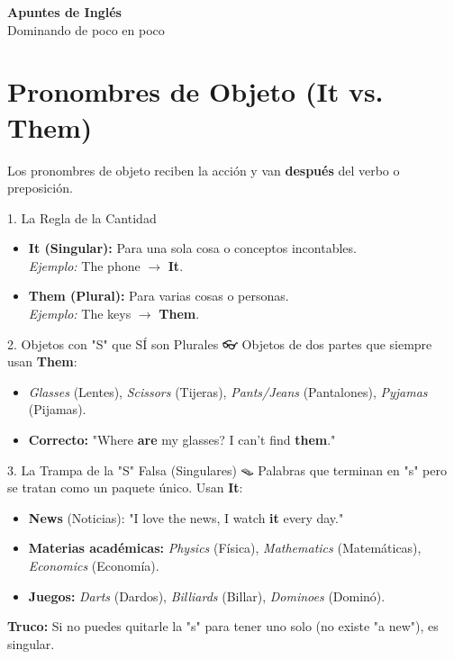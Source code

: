 \documentclass[12pt,a4paper]{article}
\begin{document}
\begin{center}
    {\Huge \color{primary} \textbf{Apuntes de Inglés}} \\
    \vspace{0.2cm}
    {\large \color{secondary} Dominando de poco en poco}
\end{center}

\vspace{0.5cm}

\section{Pronombres de Objeto (It vs. Them)}

Los pronombres de objeto reciben la acción y van \textbf{después} del verbo o preposición.

\begin{note}{1. La Regla de la Cantidad 🔢}
    \begin{itemize}[noitemsep]
        \item \textbf{It (Singular):} Para una sola cosa o conceptos incontables. \\
              \textit{Ejemplo:} The phone $\to$ \textbf{It}.
        \item \textbf{Them (Plural):} Para varias cosas o personas. \\
              \textit{Ejemplo:} The keys $\to$ \textbf{Them}.
    \end{itemize}
\end{note}

\begin{note}{2. Objetos con "S" que SÍ son Plurales 👓}
    Objetos de dos partes que siempre usan \textbf{Them}:
    \begin{itemize}[noitemsep]
        \item \textit{Glasses} (Lentes), \textit{Scissors} (Tijeras), \textit{Pants/Jeans} (Pantalones), \textit{Pyjamas} (Pijamas).
        \item \textbf{Correcto:} "Where \textbf{are} my glasses? I can't find \textbf{them}."
    \end{itemize}
\end{note}

\begin{trap}{3. La Trampa de la "S" Falsa (Singulares) 🪤}
    Palabras que terminan en "s" pero se tratan como un paquete único. Usan \textbf{It}:
    \begin{itemize}[noitemsep]
        \item \textbf{News} (Noticias): "I love the news, I watch \textbf{it} every day."
        \item \textbf{Materias académicas:} \textit{Physics} (Física), \textit{Mathematics} (Matemáticas), \textit{Economics} (Economía).
        \item \textbf{Juegos:} \textit{Darts} (Dardos), \textit{Billiards} (Billar), \textit{Dominoes} (Dominó).
    \end{itemize}
    \textbf{Truco:} Si no puedes quitarle la "s" para tener uno solo (no existe "a new"), es singular.
\end{trap}
\end{document}
